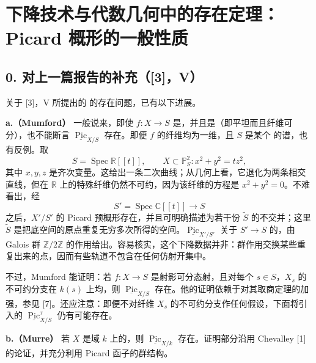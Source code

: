 \chapter{下降技术与代数几何中的存在定理：Picard 概形的一般性质}

\section*{0. 对上一篇报告的补充（[3]，V）}
关于 [3]，V 所提出的  的存在问题，已有以下进展。

\textbf{a.（Mumford）} 一般说来，即使 $f\colon X\to S$ 是，并且是（即平坦而且纤维可分），也不能断言 $\underline{\operatorname{Pic}}_{X/S}$ 存在。即便 $f$ 的纤维均为一维，且 $S$ 是某个 的谱，也有反例。取
\[
 S=\operatorname{Spec}\mathbb R[[t]],\qquad
 X\subset\mathbb P^2_S\colon x^2+y^2=tz^2,
\]
其中 $x,y,z$ 是齐次变量。这给出一条二次曲线；从几何上看，它退化为两条相交直线，但在 $\mathbb R$ 上的特殊纤维仍然不可约，因为该纤维的方程是 $x^2+y^2=0$。不难看出，经
\[
 S'=\operatorname{Spec}\mathbb C[[t]]\longrightarrow S
\]
之后，$X'/S'$ 的 Picard 预概形存在，并且可明确描述为若干份 $\widetilde S$ 的不交并；这里 $\widetilde S$ 是把底空间的原点重复无穷多次所得的空间。$\underline{\operatorname{Pic}}_{X'/S'}$ 关于 $S'\to S$ 的，由 Galois 群 $\mathbb Z/2\mathbb Z$ 的作用给出。容易核实，这个下降数据并非：群作用交换某些重复出来的点，因而有些轨道不包含在任何仿射开集中。

不过，Mumford 能证明：若 $f\colon X\to S$ 是射影可分态射，且对每个 $s\in S$，$X_s$ 的不可约分支在 $k(s)$ 上均，则 $\underline{\operatorname{Pic}}_{X/S}$ 存在。他的证明依赖于对其取商定理的加强，参见 [7]。还应注意：即便不对纤维 $X_s$ 的不可约分支作任何假设，下面将引入的 $\underline{\operatorname{Pic}}^\tau_{X/S}$ 仍有可能存在。

\textbf{b.（Murre）} 若 $X$ 是域 $k$ 上的，则 $\underline{\operatorname{Pic}}_{X/k}$ 存在。证明部分沿用 Chevalley [1] 的论证，并充分利用 Picard 函子的群结构。


